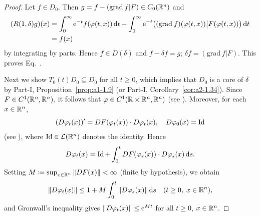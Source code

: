 \begin{proof}
Let $f \in D_{0}$.
Then $g = f - (\mathrm{grad}\: f | F) \in C_{0}(\mathbb{R}^{n})$ and
\begin{equation*}
\begin{split}
(R(1,\delta)g)(x) 
&= \int_{0}^{\infty} \eu^{-t}f(\phi(t,x)) \dt - \int_{0}^{\infty} 
\eu^{-t}\big((\mathrm{grad}\: f)(\phi(t,x)) \big| F(\phi(t,x))\big) \dt \\
&= f(x)
\end{split}
\end{equation*}
 by integrating by parts.
Hence $f \in D(\delta)$ and $f - \delta f = g$; \ie $\delta f = (\mathrm{grad}\: f|F)$.
This proves Eq.~.


Next we show $T_{0}(t)D_{0} \subseteq D_{0}$ for all $t \geq 0$, which implies that $D_{0}$
is a core of\/ $\delta$ by Part-I, Proposition~\ref{prop:a1-1.9}
(or Part-I, Corollary~\ref{cor:a2-1.34}).
Since $F \in C^{1}(\mathbb{R}^{n},\mathbb{R}^{n})$, it follows that
$\phi \in C^{1}(\R \times \R^{n},\R^{n})$
(see \eg \textcite[15.2]{hirschsmale:1974}).
Moreover, for each $x \in \mathbb{R}^{n}$,
\[
    (D\phi_{t}(x))' = DF(\phi_{t}(x)) \cdot D\phi_{t}(x), \quad D\phi_{0}(x) = \Id
\]
(see \textcite[p.\,300]{hirschsmale:1974}), where $\operatorname{Id} \in \mathcal{L}(\mathbb{R}^{n})$ denotes the identity.
Hence
\[
    D\phi_{t}(x) = \Id + \int_{0}^{t} DF(\phi_{s}(x)) \cdot D\phi_{s}(x) \ds.
\]
Setting $M \coloneq \sup_{x \in \mathbb{R}^{n}} \|DF(x)\| < \infty$ (finite by hypothesis),
we obtain
\[
    \|D\phi_{t}(x)\| \leq 1 + M\int_{0}^{t} \|D\phi_{s}(x)\| \ds
    \quad (t \geq 0,\; x \in \R^{n}),
\]
and Gronwall's inequality gives $\|D\phi_{t}(x)\| \leq \eu^{Mt}$ for all $t \geq 0$,
$x \in \mathbb{R}^{n}$.


\end{proof}
